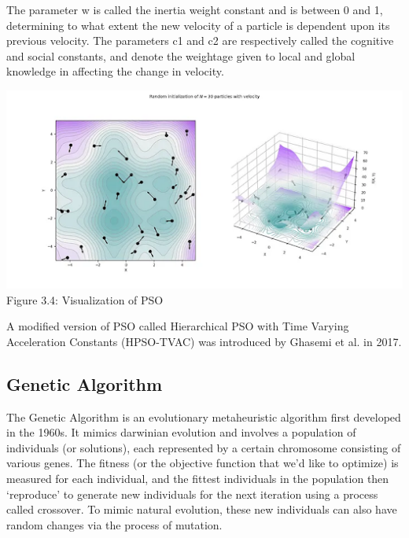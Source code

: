 The parameter w is called the inertia weight constant and is between 0 and 1, determining to what extent the new velocity of a particle is dependent upon its previous velocity. The parameters c1 and c2 are respectively called the cognitive and social constants, and denote the weightage given to local and global knowledge in affecting the change in velocity.

\begin{center}
   \includegraphics[width=5.5in]{images/3.4.png} 
   \\\fontsize{11pt}{24pt} Figure 3.4: Visualization of PSO
\end{center}



A modified version of PSO called Hierarchical PSO with Time Varying Acceleration Constants (HPSO-TVAC) was introduced by Ghasemi et al.  \cite{24} in  2017.
\subsection{Genetic Algorithm}
The Genetic Algorithm  \cite{9} is an evolutionary metaheuristic algorithm first developed in the 1960s. It mimics darwinian evolution and involves a population of individuals (or solutions), each represented by a certain chromosome consisting of various genes. The fitness (or the objective function that we’d like to optimize) is measured for each individual, and the fittest individuals in the population then ‘reproduce’ to generate new individuals for the next iteration using a process called crossover. To mimic natural evolution, these new individuals can also have random changes via the process of mutation. 


